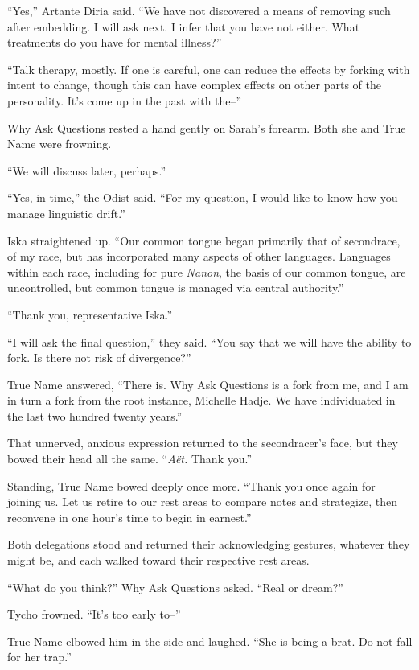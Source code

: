``Yes,'' Artante Diria said. ``We have not discovered a means of removing such after embedding. I will ask next. I infer that you have not either. What treatments do you have for mental illness?''

``Talk therapy, mostly. If one is careful, one can reduce the effects by forking with intent to change, though this can have complex effects on other parts of the personality. It's come up in the past with the--''

Why Ask Questions rested a hand gently on Sarah's forearm. Both she and True Name were frowning.

``We will discuss later, perhaps.''

``Yes, in time,'' the Odist said. ``For my question, I would like to know how you manage linguistic drift.''

Iska straightened up. ``Our common tongue began primarily that of secondrace, of my race, but has incorporated many aspects of other languages. Languages within each race, including for pure \emph{Nanon}, the basis of our common tongue, are uncontrolled, but common tongue is managed via central authority.''

``Thank you, representative Iska.''

``I will ask the final question,'' they said. ``You say that we will have the ability to fork. Is there not risk of divergence?''

True Name answered, ``There is. Why Ask Questions is a fork from me, and I am in turn a fork from the root instance, Michelle Hadje. We have individuated in the last two hundred twenty years.''

That unnerved, anxious expression returned to the secondracer's face, but they bowed their head all the same. ``\emph{Aët.} Thank you.''

Standing, True Name bowed deeply once more. ``Thank you once again for joining us. Let us retire to our rest areas to compare notes and strategize, then reconvene in one hour's time to begin in earnest.''

Both delegations stood and returned their acknowledging gestures, whatever they might be, and each walked toward their respective rest areas.

``What do you think?'' Why Ask Questions asked. ``Real or dream?''

Tycho frowned. ``It's too early to--''

True Name elbowed him in the side and laughed. ``She is being a brat. Do not fall for her trap.''

